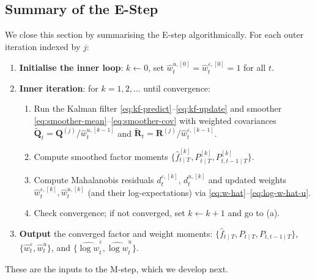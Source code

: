 \documentclass[11pt, a4paper, oneside]{article}
\newcommand{\mR}{\mathbf{R}}
\newcommand{\mQ}{\mathbf{Q}}
\begin{document}
\subsection{Summary of the E-Step}
\label{subsec:e-step-summary}

We close this section by summarising the E-step algorithmically. For
each outer iteration indexed by $j$:

\begin{enumerate}[leftmargin=1.5em, itemsep=3pt]
    \item \textbf{Initialise the inner loop}: $k \gets 0$, set
          $\hat{w}^{u,[0]}_t = \hat{w}^{\varepsilon,[0]}_t = 1$ for all $t$.
    \item \textbf{Inner iteration}: for $k = 1, 2, \ldots$ until
          convergence:
          \begin{enumerate}[leftmargin=1.5em, itemsep=2pt]
              \item Run the Kalman filter \eqref{eq:kf-predict}--\eqref{eq:kf-update}
                    and smoother \eqref{eq:smoother-mean}--\eqref{eq:smoother-cov}
                    with weighted covariances
                    $\tilde{\mQ}_t = \mQ^{(j)} / \hat{w}^{u,[k-1]}_t$ and
                    $\tilde{\mR}_t = \mR^{(j)} / \hat{w}^{\varepsilon,[k-1]}_t$.
              \item Compute smoothed factor moments
                    $\{\hat{f}_{t \mid T}^{[k]}, P_{t \mid T}^{[k]}, P_{t, t-1 \mid T}^{[k]}\}$.
              \item Compute Mahalanobis residuals $d^{\varepsilon,[k]}_t$,
                    $d^{u,[k]}_t$ and updated weights $\hat{w}^{\varepsilon,[k]}_t, \hat{w}^{u,[k]}_t$ (and their log-expectations) via \eqref{eq:w-hat}--\eqref{eq:log-w-hat-u}.
                  
              \item Check convergence; if not converged, set $k \gets k+1$
                    and go to (a).
          \end{enumerate}
    \item \textbf{Output} the converged factor and weight moments:
          $\{\hat{f}_{t \mid T}, P_{t \mid T}, P_{t, t-1 \mid T}\}$,
          $\{\hat{w}^\varepsilon_t, \hat{w}^u_t\}$, and
          $\{\widehat{\log w}^\varepsilon_t, \widehat{\log w}^u_t\}$.
\end{enumerate}
These are the inputs to the M-step, which we develop next.
\end{document}
